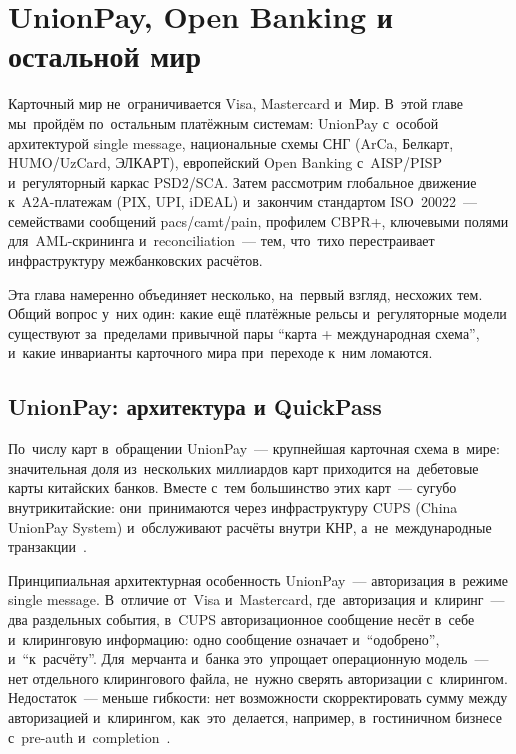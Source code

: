 \chapter{UnionPay, Open Banking и остальной мир}
\label{ch:global}

\begin{kaobox}[title=Что вы узнаете из этой главы]
  Карточный мир не~ограничивается Visa, Mastercard и~Мир. В~этой главе
  мы~пройдём по~остальным платёжным системам: UnionPay с~особой
  архитектурой single message, национальные схемы СНГ (ArCa, Белкарт,
  HUMO/UzCard, ЭЛКАРТ), европейский Open Banking с~AISP/PISP
  и~регуляторный каркас PSD2/SCA. Затем рассмотрим глобальное движение
  к~A2A-платежам (PIX, UPI, iDEAL) и~закончим стандартом ISO~20022~--- семействами сообщений pacs/camt/pain,
  профилем CBPR+, ключевыми полями для~AML-скрининга и~reconciliation~---
  тем, что~тихо перестраивает инфраструктуру межбанковских расчётов.
\end{kaobox}

Эта глава намеренно объединяет несколько, на~первый взгляд,
несхожих тем. Общий вопрос у~них один: какие ещё платёжные
рельсы и~регуляторные модели существуют за~пределами привычной
пары \enquote{карта + международная схема}, и~какие инварианты
карточного мира при~переходе к~ним ломаются.


\section{UnionPay: архитектура и QuickPass}
\label{sec:up-architecture}

По~числу карт в~обращении UnionPay~--- крупнейшая карточная схема
в~мире: значительная доля из~нескольких миллиардов карт приходится
на~дебетовые карты китайских банков. Вместе с~тем большинство этих карт~---
сугубо внутрикитайские: они~принимаются через инфраструктуру CUPS
(China UnionPay System) и~обслуживают расчёты внутри КНР, а~не~международные
транзакции~.

Принципиальная архитектурная особенность UnionPay~--- авторизация
в~режиме single message. В~отличие от~Visa и~Mastercard, где~авторизация
и~клиринг~--- два раздельных события, в~CUPS авторизационное сообщение
несёт в~себе и~клиринговую информацию: одно сообщение означает
и~\enquote{одобрено}, и~\enquote{к~расчёту}. Для~мерчанта и~банка
это~упрощает операционную модель~--- нет отдельного клирингового
файла, не~нужно сверять авторизации с~клирингом. Недостаток~---
меньше гибкости: нет возможности скорректировать сумму между авторизацией
и~клирингом, как~это~делается, например, в~гостиничном бизнесе с~pre-auth
и~completion~.

